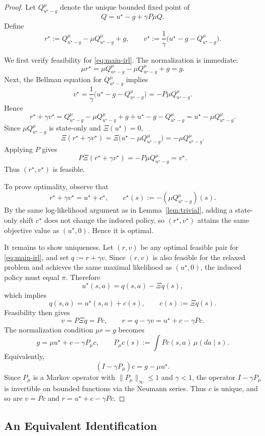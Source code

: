 \documentclass{article}
\newcommand{\1}{\mathbbm{1}}
\begin{document}
\begin{proof}
Let \(Q^\mu_{u^\star-g}\) denote the unique bounded fixed point of
\[
Q = u^\star-g+\gamma P\mu Q.
\]
Define
\[
r^\star
:=
Q^\mu_{u^\star-g}-\mu Q^\mu_{u^\star-g}+g,
\qquad
v^\star
:=
\frac{1}{\gamma}\bigl(u^\star-g-Q^\mu_{u^\star-g}\bigr).
\]

We first verify feasibility for \eqref{eq:main-irl}. The normalization is
immediate:
\[
\mu r^\star
=
\mu Q^\mu_{u^\star-g}-\mu Q^\mu_{u^\star-g}+g
=
g.
\]
Next, the Bellman equation for \(Q^\mu_{u^\star-g}\) implies
\[
v^\star
=
\frac{1}{\gamma}\bigl(u^\star-g-Q^\mu_{u^\star-g}\bigr)
=
-P\mu Q^\mu_{u^\star-g}.
\]
Hence
\[
r^\star+\gamma v^\star
=
Q^\mu_{u^\star-g}-\mu Q^\mu_{u^\star-g}+g
+
u^\star-g-Q^\mu_{u^\star-g}
=
u^\star-\mu Q^\mu_{u^\star-g}.
\]
Since \(\mu Q^\mu_{u^\star-g}\) is state-only and \(\Xi(u^\star)=0\),
\[
\Xi(r^\star+\gamma v^\star)
=
\Xi\!\bigl(u^\star-\mu Q^\mu_{u^\star-g}\bigr)
=
-\mu Q^\mu_{u^\star-g}.
\]
Applying \(P\) gives
\[
P\Xi(r^\star+\gamma v^\star)
=
-P\mu Q^\mu_{u^\star-g}
=
v^\star.
\]
Thus \((r^\star,v^\star)\) is feasible.

To prove optimality, observe that
\[
r^\star+\gamma v^\star
=
u^\star+c^\star,
\qquad
c^\star(s):= -(\mu Q^\mu_{u^\star-g})(s).
\]
By the same log-likelihood argument as in Lemma~\ref{lem:trivial}, adding a
state-only shift \(c^\star\) does not change the induced policy, so
\((r^\star,v^\star)\) attains the same objective value as \((u^\star,0)\).
Hence it is optimal.

It remains to show uniqueness. Let \((r,v)\) be any optimal feasible pair for
\eqref{eq:main-irl}, and set \(q:=r+\gamma v\). Since \((r,v)\) is also
feasible for the relaxed problem and achieves the same maximal likelihood as
\((u^\star,0)\), the induced policy must equal \(\pi\). Therefore
\[
u^\star(s,a)
=
q(s,a)-\Xi q(s),
\]
which implies
\[
q(s,a)=u^\star(s,a)+c(s),
\qquad
c(s):=\Xi q(s).
\]
Feasibility then gives
\[
v
=
P\Xi q
=
Pc,
\qquad
r
=
q-\gamma v
=
u^\star+c-\gamma Pc.
\]
The normalization condition \(\mu r=g\) becomes
\[
g
=
\mu u^\star + c - \gamma P_\mu c,
\qquad
P_\mu c(s):=\int Pc(s,a)\,\mu(da\mid s).
\]
Equivalently,
\[
(I-\gamma P_\mu)c
=
g-\mu u^\star.
\]
Since \(P_\mu\) is a Markov operator with \(\|P_\mu\|_\infty\le 1\) and
\(\gamma<1\), the operator \(I-\gamma P_\mu\) is invertible on bounded
functions via the Neumann series. Thus \(c\) is unique, and so are \(v=Pc\)
and \(r=u^\star+c-\gamma Pc\).
\end{proof}

\subsection{An Equivalent Identification}
\end{document}
